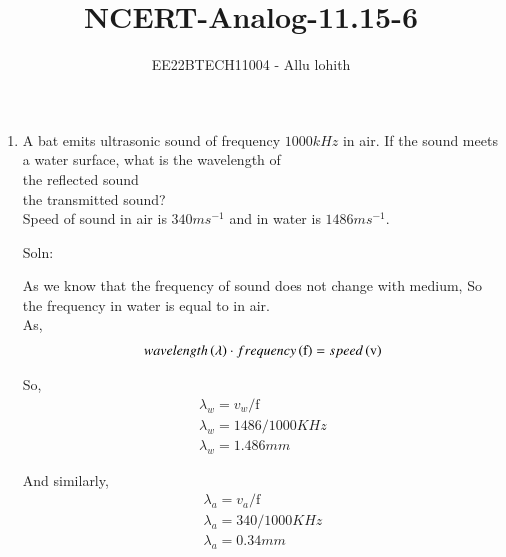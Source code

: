 \documentclass[journal,12pt,twocolumn]{IEEEtran}
\theoremstyle{remark}
\begin{document}

\vspace{3cm}

\title{NCERT-Analog-11.15-6}
\author{EE22BTECH11004 - Allu lohith}

\maketitle
\newpage
\bigskip

\renewcommand{\thefigure}{\theenumi}
\renewcommand{\thetable}{\theenumi}
\begin{enumerate}
\item A bat emits ultrasonic sound of frequency $1000 kHz$ in air. If the sound meets a water surface, what is the wavelength of\\[0pt] \brak the reflected sound \\[0pt]
 the transmitted sound?\\
Speed of sound in air is $340 ms^{-1}$ and in water is $1486 ms^{-1}$.
\item[Soln:]

As we know that the frequency of sound does not change with medium, So the frequency in water is equal to in air.\\
As,
\begin{align}
wavelength\left(\lambda\right)\cdot frequency\left(\text{f}\right)=speed\left(\text{v}\right)
\end{align}
\begin{table}[htbp]
\centering

\vspace{0.5cm}
\caption{\normalsize $Parameters$}
\label{tab:parameters}
\end{table}

So,
\begin{align}
\lambda_w=v_w/ \text{f}\\
\lambda_w=1486/1000KHz\\
\lambda_w=1.486mm    
\end{align}

And similarly,
\begin{align}
\lambda_a=v_a/\mathrm{f}\\
\lambda_a=340/1000KHz\\
\lambda_a=0.34mm    
\end{align}


\end{enumerate}
\end{document}
